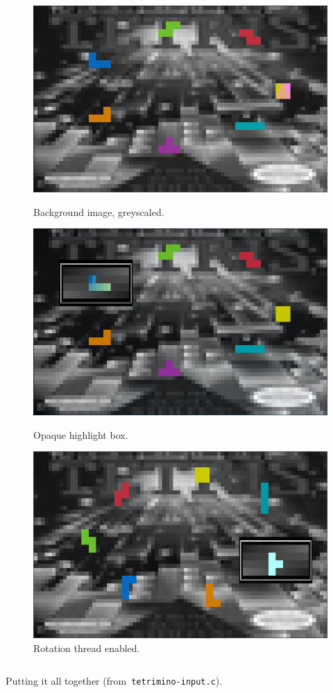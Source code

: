\begin{figure}[!htbp]
  \centering
  \begin{minipage}{0.30\textwidth}
    \includegraphics[width=1\linewidth]{media/tetrimino-bg.png}
    \caption{Background image, greyscaled.}
    \label{fig:tetrimino-bg}
  \end{minipage}\hfill
  \begin{minipage}{0.30\textwidth}
    \includegraphics[width=1\linewidth]{media/tetrimino-bgbox.png}
    \caption{Opaque highlight box.}
  \end{minipage}\hfill
  \begin{minipage}{0.30\textwidth}
    \includegraphics[width=1\linewidth]{media/tetrimino-rot.png}
    \caption{Rotation thread enabled.}
  \end{minipage}\hfill
\end{figure}

\begin{listing}[!htbp]
\inputminted[]{C}{code/tetrimino-inputmain.h}
\caption{Putting it all together (from~\texttt{tetrimino-input.c}).}
\label{list:tetrimino-inputmain}
\end{listing}
